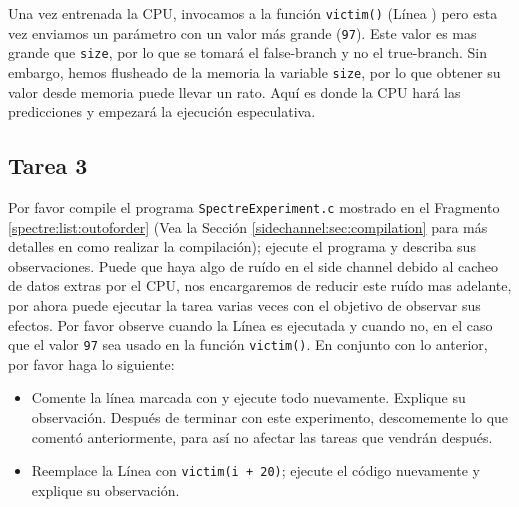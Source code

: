 Una vez entrenada la CPU, invocamos a la función \texttt{victim()} (Línea ) pero esta vez enviamos un parámetro con un valor más grande (\texttt{97}). Este valor es mas grande que \texttt{size}, por lo que se tomará el false-branch y no el true-branch. Sin embargo, hemos flusheado de la memoria la variable \texttt{size}, por lo que obtener su valor desde memoria puede llevar un rato. Aquí es donde la CPU hará las predicciones y empezará la ejecución especulativa.



\subsection{Tarea 3} 

Por favor compile el programa \texttt{SpectreExperiment.c} mostrado en el Fragmento \ref{spectre:list:outoforder}  (Vea la Sección \ref{sidechannel:sec:compilation} para más detalles en como realizar la compilación); ejecute el programa y describa sus observaciones. Puede que haya algo de ruído en el side channel debido al cacheo de datos extras por el CPU, nos encargaremos de reducir este ruído mas adelante, por ahora puede ejecutar la tarea varias veces con el objetivo de observar sus efectos. Por favor observe cuando la Línea  es ejecutada y cuando no, en el caso que el valor \texttt{97} sea usado en la función \texttt{victim()}. 
En conjunto con lo anterior, por favor haga lo siguiente:


\begin{itemize}
\item Comente la línea marcada con  y ejecute todo nuevamente. Explique su observación. Después de terminar con este experimento, descomemente lo que comentó anteriormente, para así no afectar las tareas que vendrán después.

\item Reemplace la Línea  con \texttt{victim(i + 20)}; ejecute el código nuevamente y explique su observación.
\end{itemize}
 



